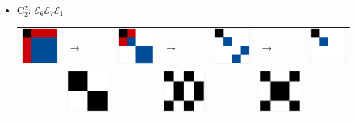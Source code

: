 \documentclass[11pt,dvipsnames]{article} %
\newcommand{\E}{\mathcal{E}}
\newcommand{\1}{\mathds{1}}
\begin{document}
\begin{itemize}
\begin{itemize}
\item C$_2^2$: $\E_6\E_7\E_1$\newline
\begin{tabular}{m{2cm} m{2cm} m{2cm} m{2cm} m{2cm} m{2cm} m{2cm}}
\includegraphics[width=2.2cm]{img-JA/id}  
& \hspace{0.8cm}$\longrightarrow$ 
& \includegraphics[width=2.2cm]{img-JA/8comp} 
& \hspace{0.8cm}$\longrightarrow$ 
& \includegraphics[width=2.2cm]{img-JA/4comp}
& \hspace{0.8cm}$\longrightarrow$ 
& \includegraphics[width=2.2cm]{C22}\\ 
 & \includegraphics[width=2.2cm]{img-JA/16To8} &  
 & \includegraphics[width=2.2cm]{img-JA/8To4} &
 & \includegraphics[width=2.2cm]{otroTambien}\\ 
\end{tabular}
\end{itemize}



\end{itemize}
\end{document}
